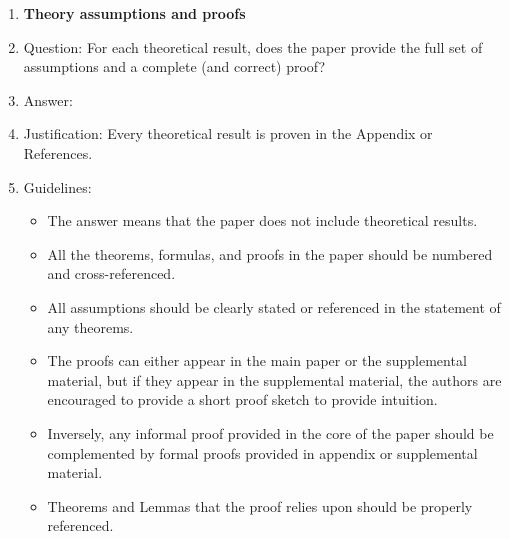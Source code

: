 \documentclass{article}
\begin{document}
\begin{enumerate}
\item {\bf Theory assumptions and proofs}
    \item[] Question: For each theoretical result, does the paper provide the full set of assumptions and a complete (and correct) proof?
    \item[] Answer: \answerYes{} %
    \item[] Justification: Every theoretical result is proven in the Appendix or References.
    \item[] Guidelines:
    \begin{itemize}
        \item The answer \answerNA{} means that the paper does not include theoretical results. 
        \item All the theorems, formulas, and proofs in the paper should be numbered and cross-referenced.
        \item All assumptions should be clearly stated or referenced in the statement of any theorems.
        \item The proofs can either appear in the main paper or the supplemental material, but if they appear in the supplemental material, the authors are encouraged to provide a short proof sketch to provide intuition. 
        \item Inversely, any informal proof provided in the core of the paper should be complemented by formal proofs provided in appendix or supplemental material.
        \item Theorems and Lemmas that the proof relies upon should be properly referenced. 
    \end{itemize}


\end{enumerate}
\end{document}
